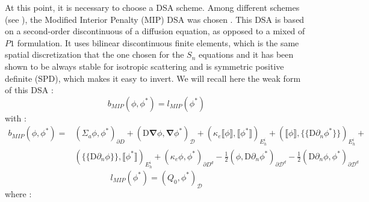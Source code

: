 \documentclass[preprint,10pt]{elsarticle}
\newcommand\bn{\boldsymbol{\nabla}}
\newcommand\ldb{\{\!\!\{}
\newcommand\rdb{\}\!\!\}}
\newcommand\llb{\llbracket}
\newcommand\rrb{\rrbracket}
\renewcommand{\(}{\left(}
\renewcommand{\)}{\right)}
\renewcommand{\[}{\left[}
\renewcommand{\]}{\right]}
\begin{document}
At this point, it is necessary to choose a DSA scheme. Among different
schemes (see \cite{adams}), the Modified Interior Penalty (MIP) DSA was
chosen \cite{mip}. This DSA is based on a second-order discontinuous of a
diffusion equation, as opposed to a mixed of $P1$ formulation.
It uses bilinear discontinuous finite elements, which is
the same spatial discretization that the one chosen for the
$S_n$ equations and it has been shown to be always stable for isotropic
scattering and is symmetric positive definite (SPD), which makes it easy to invert.
We will recall here the weak form of this DSA :
\begin{equation}
b_{MIP}(\phi,\phi^*) = l_{MIP}(\phi^*)
\end{equation}
with :
\begin{equation}
\begin{split}
b_{MIP}(\phi,\phi^*) =& (\Sigma_a \phi,\phi^*)_{\partial D} +
\(\mathrm{D}\bn\phi,\bn\phi^*\)_{\mathcal{D}} + \(\kappa_e\llb\phi\rrb,
\llb\phi^*\rrb\)_{E_h^i}
+ \(\llb\phi\rrb,\ldb \mathrm{D}\partial_n \phi^*\rdb\)_{E_h^i} +\\
&(\ldb \mathrm{D} \partial_n \phi\rdb,\llb\phi^*\rrb)_{E_h^i} + 
(\kappa_e\phi,\phi^*)_{\partial
D^d}-\frac{1}{2} \(\phi,\mathrm{D}\partial_n \phi^*\)_{\partial
\mathcal{D}^d} - \frac{1}{2} (\mathrm{D} \partial_n \phi,\phi^*)_{\partial 
\mathcal{D}^d}
\end{split}
\end{equation}
\begin{equation}
l_{MIP}(\phi^*) = (Q_0,\phi^*)_{\mathcal{D}} 
\end{equation}
where :
\end{document}
